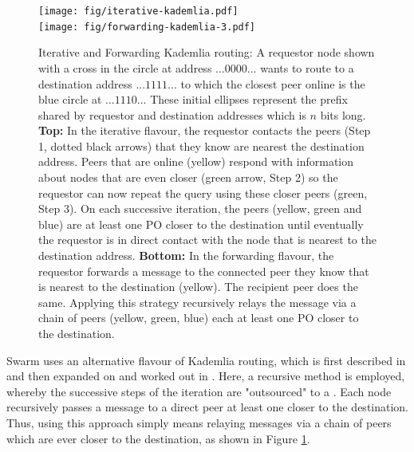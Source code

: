 \begin{figure}[htbp]
   \centering
   \vspace{-2cm} 
   \texttt{[image: fig/iterative-kademlia.pdf]}\\\vspace{-1.3cm}
   \texttt{[image: fig/forwarding-kademlia-3.pdf]}
   \caption[Iterative and Forwarding Kademlia routing \statusgreen]{Iterative and Forwarding Kademlia routing: A requestor node shown with a cross in the circle at address $...0000...$ wants to route to a destination address $...1111...$ to which the closest peer online is the blue circle at $...1110...$ These initial ellipses represent the prefix shared by requestor and destination addresses which is $n$ bits long. \textbf{Top:} In the iterative flavour, the requestor contacts the peers (Step 1, dotted black arrows) that they know are nearest the destination address. Peers that are online (yellow) respond with information about nodes that are even closer (green arrow, Step 2) so the requestor can now repeat the query using these closer peers (green, Step 3). On each successive iteration, the peers (yellow, green and blue) are at least one PO closer to the destination until eventually the requestor is in direct contact with the node that is nearest to the destination address. \textbf{Bottom:} In the forwarding flavour, the requestor forwards a message to the connected peer they know that is nearest to the destination (yellow). The recipient peer does the same. Applying this strategy recursively relays the message via a chain of peers (yellow, green, blue) each at least one PO closer to the destination.}
   \label{fig:iterative-forwarding-kademlia}
\end{figure}


Swarm uses an alternative flavour of Kademlia routing, which is first described in \cite{heep2010r} and then expanded on and worked out in \cite{tronetal2019-network}. Here, a recursive method is employed, whereby the successive steps of the iteration are "outsourced" to a .
Each node recursively passes a message to a direct peer at least one  closer to the destination. Thus,  using this approach simply means relaying messages via a chain of peers which are ever closer to the destination, as shown in Figure \ref{fig:iterative-forwarding-kademlia}.


